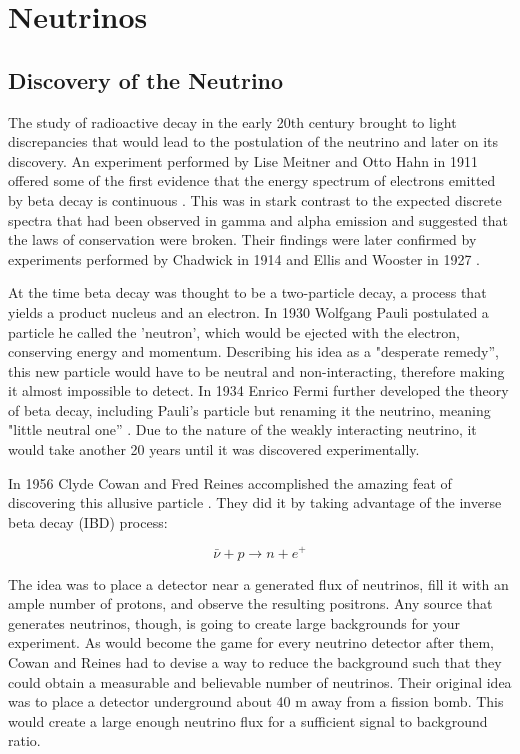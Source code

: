 \chapter{Neutrinos}

\section{Discovery of the Neutrino}

The study of radioactive decay in the early 20th century brought to light discrepancies that would lead to the postulation of the neutrino and later on its discovery. 
An experiment performed by Lise Meitner and Otto Hahn in 1911 offered some of the first evidence that the energy spectrum of electrons emitted by beta decay is continuous \cite{Hahn:1911}. 
This was in stark contrast to the expected discrete spectra that had been observed in gamma and alpha emission and suggested that the laws of conservation were broken. 
Their findings were later confirmed by experiments performed by Chadwick in 1914 \cite{Chadwick:1914zz} and Ellis and Wooster in 1927 \cite{Ellis:1927}. 

At the time beta decay was thought to be a two-particle decay, a process that yields a product nucleus and an electron.
In 1930 Wolfgang Pauli postulated a particle he called the 'neutron', which would be ejected with the electron, conserving energy and momentum.
Describing his idea as a "desperate remedy'', this new particle would have to be neutral and non-interacting, therefore making it almost impossible to detect.
In 1934 Enrico Fermi further developed the theory of beta decay, including Pauli's particle but renaming it the neutrino, meaning "little neutral one'' \cite{Fermi:1934hr}.
Due to the nature of the weakly interacting neutrino, it would take another 20 years until it was discovered experimentally.

In 1956 Clyde Cowan and Fred Reines accomplished the amazing feat of discovering this allusive particle \cite{Cowan}. They did it by taking advantage of the inverse beta decay (IBD) process:

\begin{equation}
	\bar{\nu} + p \rightarrow n + e^{+}
\end{equation}

The idea was to place a detector near a generated flux of neutrinos, fill it with an ample number of protons, and observe the resulting positrons. 
Any source that generates neutrinos, though, is going to create large backgrounds for your experiment. 
As would become the game for every neutrino detector after them, Cowan and Reines had to devise a way to reduce the background such that they could obtain a measurable and believable number of neutrinos.
Their original idea was to place a detector underground about 40 m away from a fission bomb. 
This would create a large enough neutrino flux for a sufficient signal to background ratio. 

